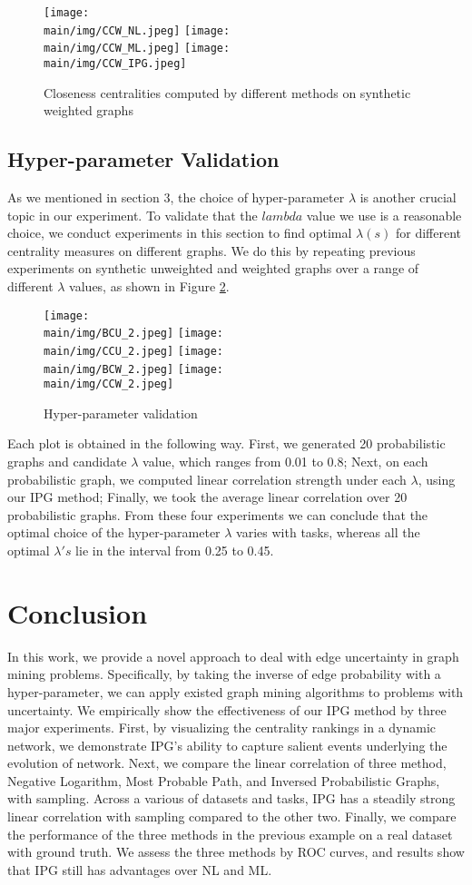 \documentclass[\main/thesis.tex]{subfiles}
\begin{document}
\begin{figure}
\texttt{[image: \\main/img/CCW\_NL.jpeg]}
\texttt{[image: \\main/img/CCW\_ML.jpeg]}
\centering
\texttt{[image: \\main/img/CCW\_IPG.jpeg]}
\caption{Closeness centralities computed by different methods on synthetic weighted graphs}
\label{cl_weighted}
\end{figure}


\subsection{Hyper-parameter Validation}
As we mentioned in section 3, the choice of hyper-parameter $\lambda$ is another crucial topic in our experiment. To validate that the $lambda$ value we use is a reasonable choice, we conduct experiments in this section to find optimal $\lambda (s)$ for different centrality measures on different graphs. We do this by repeating previous experiments on synthetic unweighted and weighted graphs over a range of different $\lambda$ values, as shown in Figure \ref{hyper}. \\

\begin{figure}
\texttt{[image: \\main/img/BCU\_2.jpeg]}
\texttt{[image: \\main/img/CCU\_2.jpeg]}
\texttt{[image: \\main/img/BCW\_2.jpeg]}
\texttt{[image: \\main/img/CCW\_2.jpeg]}
\caption{Hyper-parameter validation}
\label{hyper}
\end{figure}

Each plot is obtained in the following way. First, we generated 20 probabilistic graphs and candidate $\lambda$ value, which ranges from 0.01 to 0.8; Next, on each probabilistic graph, we computed linear correlation strength under each $\lambda$, using our IPG method; Finally, we took the average linear correlation over 20 probabilistic graphs. From these four experiments we can conclude that the optimal choice of the hyper-parameter $\lambda$ varies with tasks, whereas all the optimal $\lambda's$ lie in the interval from 0.25 to 0.45. 
\section{Conclusion}
In this work, we provide a novel approach to deal with edge uncertainty in graph mining problems. Specifically, by taking the inverse of edge probability with a hyper-parameter, we can apply existed graph mining algorithms to problems with uncertainty. We empirically show the effectiveness of our IPG method by three major experiments. First, by visualizing the centrality rankings in a dynamic network, we demonstrate IPG's ability to capture salient events underlying the evolution of network. Next, we compare the linear correlation of three method, Negative Logarithm, Most Probable Path, and Inversed Probabilistic Graphs, with sampling. Across a various of datasets and tasks, IPG has a steadily strong linear correlation with sampling compared to the other two. Finally, we compare the performance of the three methods in the previous example on a real dataset with ground truth. We assess the three methods by ROC curves, and results show that IPG still has advantages over NL and ML. 
\end{document}
